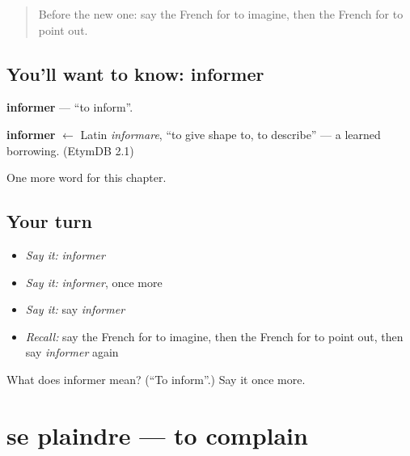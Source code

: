 \label{lesson:FR-C209-informer}



\begin{quote}
Before the new one: say the French for to imagine, then the French for to point out.
\end{quote}

\subsection*{You'll want to know: informer}
\textbf{informer} — \textquotedblleft{}to inform\textquotedblright{}.

\begin{cousinweb}
\textbf{informer} $\leftarrow$ Latin \emph{informare}, \textquotedblleft{}to give shape to, to describe\textquotedblright{} — a learned borrowing. (EtymDB 2.1)
\end{cousinweb}

\begin{grammarlens}[title={What you've built}]
One more word for this chapter.
\end{grammarlens}

\subsection*{Your turn}
\begin{itemize}
\raggedright
  \item \emph{Say it:} \emph{informer}
  \item \emph{Say it:} \emph{informer}, once more
  \item \emph{Say it:} say \emph{informer}
  \item \emph{Recall:} say the French for to imagine, then the French for to point out, then say \emph{informer} again
\end{itemize}

\begin{tcolorbox}[breakable,colback=teal!4,colframe=teal!35!black,title={Before you move on}]
What does informer mean? (\textquotedblleft{}To inform\textquotedblright{}.) Say it once more.
\end{tcolorbox}
\section[se plaindre]{se plaindre — to complain}

\label{lesson:FR-C209-plaindre}



